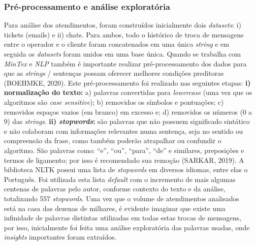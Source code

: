 \documentclass[twocolumn]{rbef}
\newcommand{\1}{\mathbbm{1}}
\begin{document}
\subsubsection{Pré-processamento e análise exploratória} \label{Sessao4.2.1}
Para análise dos atendimentos, foram construídos inicialmente dois \emph{datasets}: i) tickets (emails) e ii) chats. Para ambos, todo o histórico de troca de mensagens entre o operador e o cliente foram concatenados em uma única \emph{string} e em seguida os \emph{datasets} foram unidos em uma base única. Quando se trabalha com \emph{MinTex} e \emph{NLP} também é importante realizar pré-processamento dos dados para que as \emph{strings} / sentenças possam oferecer melhores condições preditoras (BOEHMKE, 2020)\cite{BOEHMKE}. Este pré-processamento foi realizado nas seguintes etapas:
\newline\linebreak\textbf{i) normalização do texto:} a) palavras convertidas para \emph{lowercase} (uma vez que os algoritmos são \emph{case sensitive}); b) removidos os símbolos e pontuações; c) removidos espaços vazios (em branco) em excesso e; d) removidos os números (0 a 9) das \emph{strings}.
\newline\linebreak\textbf{ii) \emph{stopwords}:} são palavras que não possuem significado sintático e não colaboram com informações relevantes numa sentença, seja no sentido ou compreensão da frase, como também poderão atrapalhar ou confundir o algoritmo. São palavras como: “e”, “ou”, “para”, “de” e similares, preposições e termos de ligamento; por isso é recomendado sua remoção (SARKAR, 2019)\cite{SARKAR}. A biblioteca NLTK possui uma lista de \emph{stopwords} em diversos idiomas, entre elas o Português. Foi utilizada esta lista \emph{default} com o incremento de mais algumas centenas de palavras pelo autor, conforme contexto do texto e da análise, totalizando 557 \emph{stopwords}.
\newline\linebreak Uma vez que o volume de atendimentos analisados está na casa das dezenas de milhares, é evidente imaginar que existe uma infinidade de palavras distintas utilizadas em todas estas trocas de mensagens, por isso, inicialmente foi feita uma análise exploratória das palavras usadas, onde \emph{insights} importantes foram extraídos.
\end{document}
